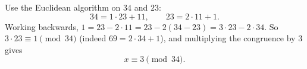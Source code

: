 Use the Euclidean algorithm on $34$ and $23$:
\[34=1\cdot23+11,\qquad23=2\cdot11+1 .\]
Working backwards, $1=23-2\cdot11=23-2(34-23)=3\cdot23-2\cdot34$. So $3\cdot23\equiv1\pmod{34}$ (indeed $69=2\cdot34+1$), and multiplying the congruence by $3$ gives
\[x\equiv\boxed{3}\pmod{34}.\]
